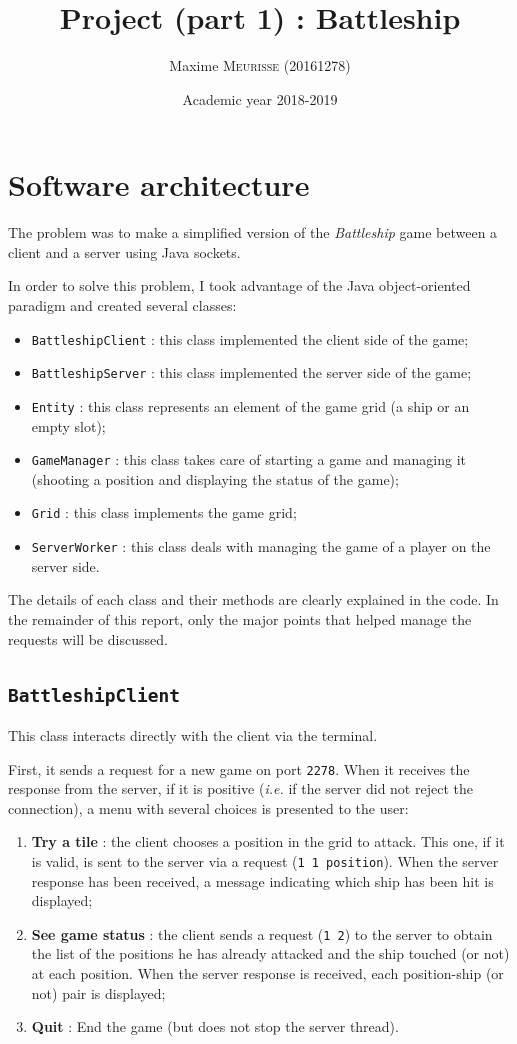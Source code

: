 \documentclass[a4paper, 12pt]{article}
\title{Project (part 1) : Battleship}
\author{Maxime \textsc{Meurisse} (20161278)\\}
\date{Academic year 2018-2019}
\begin{document}
	
	\section{Software architecture}
	The problem was to make a simplified version of the {\it Battleship} game between a client and a server using Java sockets.\par
	In order to solve this problem, I took advantage of the Java object-oriented paradigm and created several classes:
	\begin{itemize}
		\item \texttt{BattleshipClient} : this class implemented the client side of the game;
		\item \texttt{BattleshipServer} : this class implemented the server side of the game;
		\item \texttt{Entity} : this class represents an element of the game grid (a ship or an empty slot);
		\item \texttt{GameManager} : this class takes care of starting a game and managing it (shooting a position and displaying the status of the game);
		\item \texttt{Grid} : this class implements the game grid;
		\item \texttt{ServerWorker} : this class deals with managing the game of a player on the server side.
	\end{itemize}
	The details of each class and their methods are clearly explained in the code. In the remainder of this report, only the major points that helped manage the requests will be discussed.
	\subsection{\texttt{BattleshipClient}}
	This class interacts directly with the client via the terminal.\par
	First, it sends a request for a new game on port \texttt{2278}. When it receives the response from the server, if it is positive ({\it i.e.} if the server did not reject the connection), a menu with several choices is presented to the user:
	\begin{enumerate}
		\item {\bf Try a tile} : the client chooses a position in the grid to attack. This one, if it is valid, is sent to the server via a request (\texttt{1 1 position}). When the server response has been received, a message indicating which ship has been hit is displayed;
		\item {\bf See game status} : the client sends a request (\texttt{1 2}) to the server to obtain the list of the positions he has already attacked and the ship touched (or not) at each position. When the server response is received, each position-ship (or not) pair is displayed;
		\item {\bf Quit} : End the game (but does not stop the server thread).
	\end{enumerate}
\end{document}
